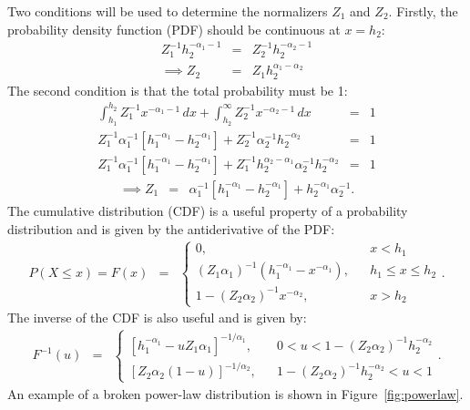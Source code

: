 \documentclass[manuscript]{aastex}
\begin{document}
Two conditions will be used to determine the normalizers $Z_1$ and $Z_2$.
Firstly, the probability density function (PDF) should be continuous at $x=h_2$:
\begin{eqnarray}
Z_1^{-1}h_2^{-\alpha_1 - 1} &=& Z_2^{-1}h_2^{-\alpha_2 - 1}\\
\implies
Z_2 &=& Z_1h_2^{\alpha_1-\alpha_2}
\end{eqnarray}
The second condition is that the total probability must be 1:
\begin{eqnarray}
\int_{h_1}^{h_2} Z_1^{-1} x^{-\alpha_1 - 1} \, dx
+
\int_{h_2}^\infty Z_2^{-1} x^{-\alpha_2 - 1} \, dx
&=& 1 \\
Z_1^{-1}\alpha_1^{-1}\left[h_1^{-\alpha_1} - h_2^{-\alpha_1}\right]
+
Z_2^{-1}\alpha_2^{-1}h_2^{-\alpha_2}
&=& 1 \\
Z_1^{-1}\alpha_1^{-1}\left[h_1^{-\alpha_1} - h_2^{-\alpha_1}\right]
+
Z_1^{-1}h_2^{\alpha_2-\alpha_1}\alpha_2^{-1}h_2^{-\alpha_2}
&=& 1
\end{eqnarray}
\begin{eqnarray}
\implies
Z_1 &=& \alpha_1^{-1}\left[h_1^{-\alpha_1} - h_2^{-\alpha_1}\right]
+
h_2^{-\alpha_1}\alpha_2^{-1}.
\end{eqnarray}
The cumulative distribution (CDF) is a useful property of a probability
distribution and is given by the antiderivative of the PDF:
\begin{eqnarray}
P(X \leq x) = F(x) &=& 
\left\{
\begin{array}{lcr}
0, & & x < h_1 \\
(Z_1\alpha_1)^{-1}\left(h_1^{-\alpha_1} - x^{-\alpha_1}\right), & & h_1 \leq x \leq h_2 \\
1 - (Z_2\alpha_2)^{-1}x^{-\alpha_2}, & & x > h_2 
\end{array}
\right.
.
\end{eqnarray}
The inverse of the CDF is also useful and is given by:
\begin{eqnarray}
F^{-1}(u) &=& 
\left\{
\begin{array}{lcr}
\left[h_1^{-\alpha_1} - uZ_1\alpha_1\right]^{-1/\alpha_1}, & & 0 < u < 1 - (Z_2\alpha_2)^{-1}h_2^{-\alpha_2}\\
\left[Z_2\alpha_2(1-u)\right]^{-1/\alpha_2},& & 1 - (Z_2\alpha_2)^{-1}h_2^{-\alpha_2}< u < 1
\end{array}
\right.
.
\end{eqnarray}
An example of a broken power-law distribution is shown in Figure~\ref{fig:powerlaw}.
\end{document}
